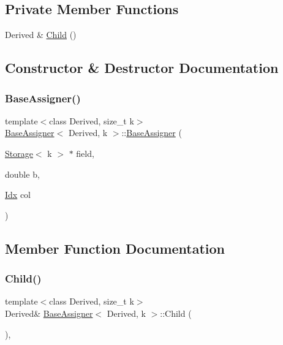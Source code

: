 \subsection*{Private Member Functions}
\begin{DoxyCompactItemize}
\item 
Derived \& \hyperlink{structBaseAssigner_a7028a545f58486b5c4ab3cab69133570}{Child} ()
\end{DoxyCompactItemize}


\subsection{Constructor \& Destructor Documentation}
\mbox{\label{structBaseAssigner_a8ad7e768d4b810deb88a0411de5dd985}} 
\subsubsection{\texorpdfstring{Base\+Assigner()}{BaseAssigner()}}
{\footnotesize\ttfamily template$<$class Derived, size\+\_\+t k$>$ \\
\hyperlink{structBaseAssigner}{Base\+Assigner}$<$ Derived, k $>$\+::\hyperlink{structBaseAssigner}{Base\+Assigner} (\begin{DoxyParamCaption}\item[{\hyperlink{Includes_8h_ae7d375db701e28425a3faea2827f134b}{Storage}$<$ k $>$ $\ast$}]{field,  }\item[{double}]{b,  }\item[{\hyperlink{Includes_8h_ae78891cd308078a2f5f9e7193065c805}{Idx}}]{col }\end{DoxyParamCaption})\hspace{0.3cm}{\ttfamily [inline]}}



\subsection{Member Function Documentation}
\mbox{\label{structBaseAssigner_a7028a545f58486b5c4ab3cab69133570}} 
\subsubsection{\texorpdfstring{Child()}{Child()}}
{\footnotesize\ttfamily template$<$class Derived, size\+\_\+t k$>$ \\
Derived\& \hyperlink{structBaseAssigner}{Base\+Assigner}$<$ Derived, k $>$\+::Child (\begin{DoxyParamCaption}{ }\end{DoxyParamCaption})\hspace{0.3cm}{\ttfamily [inline]}, {\ttfamily [private]}}

